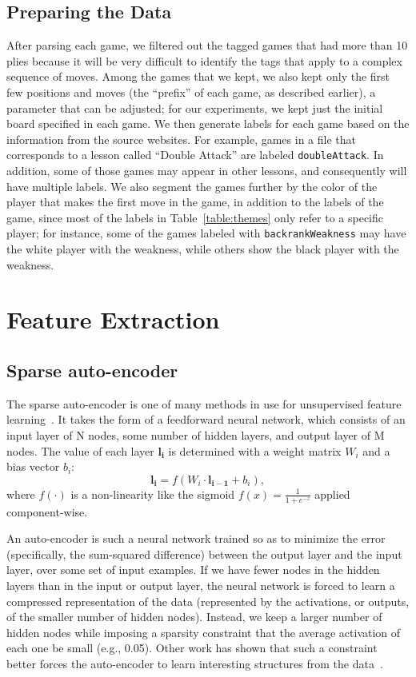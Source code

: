 \documentclass[11pt]{article}
\begin{document}
\subsection{Preparing the Data}
After parsing each game, we filtered out the tagged games that had more 
than 10 plies because it will be very difficult to identify the tags 
that apply to a complex sequence of moves. Among the games that we kept, 
we also kept only the first few positions and moves (the ``prefix'' of 
each game, as described earlier), a parameter that can be adjusted; for 
our experiments, we kept just the initial board specified in each game. 
We then generate labels for each game based on the information from the 
source websites. For example, games in a file that corresponds to a 
lesson called ``Double Attack'' are labeled {\tt doubleAttack}. In 
addition, some of those games may appear in other lessons, and 
consequently will have multiple labels. We also segment the games 
further by the color of the player that makes the first move in the 
game, in addition to the labels of the game, since most of the labels in 
Table~\ref{table:themes} only refer to a specific player; for instance, 
some of the games labeled with {\tt backrankWeakness} may have the white 
player with the weakness, while others show the black player with the 
weakness.

\section{Feature Extraction}
\subsection{Sparse auto-encoder}
The sparse auto-encoder is one of many methods in use for unsupervised 
feature learning~\cite{Coates}. It takes the form of a feedforward 
neural network, which consists of an input layer of N nodes, some number 
of hidden layers, and output layer of M nodes. The value of each layer 
$\mathbf{l_i}$ is determined with a weight matrix $W_i$ and a bias 
vector $b_i$: \[\mathbf{l_i} = f(W_i \cdot \mathbf{l_{i-1}} + b_i),\] 
where $f(\cdot)$ is a non-linearity like the sigmoid $f(x) = \frac{1}{1 
+ e^{-z}}$ applied component-wise.

An auto-encoder is such a neural network trained so as to minimize the 
error (specifically, the sum-squared difference) between the output 
layer and the input layer, over some set of input examples. If we have 
fewer nodes in the hidden layers than in the input or output layer, the 
neural network is forced to learn a compressed representation of the 
data (represented by the activations, or outputs, of the smaller number 
of hidden nodes). Instead, we keep a larger number of hidden nodes while 
imposing a sparsity constraint that the average activation of each one 
be small (e.g., 0.05). Other work has shown that such a constraint 
better forces the auto-encoder to learn interesting structures from the 
data~\cite{bengio}.
\end{document}

